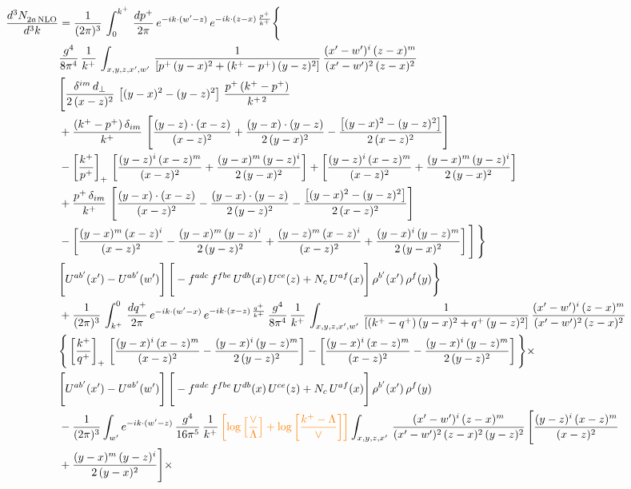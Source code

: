 \documentclass[9pt]{article}
\numberwithin{equation}{section}
\begin{document}
\begin{align}
    \frac{d^{3}N_{2a\,\rm NLO}^{\rm}}{d^{3}k}  & =  \frac{1}{(2\pi)^{3}}\,\int_{0}^{k^{+}}\, \frac{dp^{+}}{2\pi} \, e^{-ik\cdot(w'-z)}\,e^{-ik\cdot (z-x)\,\frac{p^{+}}{k^{+}}} \Bigg\{\notag \\ & \frac{g^{4}}{8\pi^{4}}\,\frac{1}{k^{+}}\,\int_{x,y,z,x',w'}\,\frac{1}{\left[p^{+}\,(y-x)^{2}+(k^{+}-p^{+})\,(y-z)^{2}\right]}\, \frac{(x'-w')^{i}\,(z-x)^{m}}{(x'-w')^{2}\,(z-x)^{2}} \notag \\ & \Bigg[\frac{\delta^{im}\,d_{\perp}}{2\,(x-z)^{2}}\,\left[(y-x)^{2}-(y-z)^{2}\right]\,\frac{p^{+}\,(k^{+}-p^{+})}{k^{+\,2}}\notag \\ & +\frac{(k^{+}-p^{+})\,\delta_{im}}{k^{+}}\,\left[\frac{(y-z)\cdot (x-z)}{(x-z)^{2}}+\frac{(y-x)\cdot (y-z)}{2\,(y-x)^{2}}-\frac{\left[(y-x)^{2}-(y-z)^{2}\right]}{2\,(x-z)^{2}}\right]\notag \\ & -\left[\frac{k^{+}}{p^{+}}\right]_{+}\,\left[\frac{(y-z)^{i}\,(x-z)^{m}}{(x-z)^{2}}+\frac{(y-x)^{m}\,(y-z)^{i}}{2\,(y-x)^{2}}\right]+ \left[\frac{(y-z)^{i}\,(x-z)^{m}}{(x-z)^{2}}+\frac{(y-x)^{m}\,(y-z)^{i}}{2\,(y-x)^{2}}\right]\notag \\ & +\frac{p^{+}\,\delta_{im}}{k^{+}}\,\left[\frac{(y-x)\cdot (x-z)}{(x-z)^{2}}-\frac{(y-x)\cdot (y-z)}{2\,(y-z)^{2}}-\frac{\left[(y-x)^{2}-(y-z)^{2}\right]}{2\,(x-z)^{2}}\right]\notag \\ &-\left[\frac{(y-x)^{m}\,(x-z)^{i}}{(x-z)^{2}}-\frac{(y-x)^{m}\,(y-z)^{i}}{2\,(y-z)^{2}}+\frac{(y-z)^{m}\,(x-z)^{i}}{(x-z)^{2}}+\frac{(y-x)^{i}\,(y-z)^{m}}{2\,(y-x)^{2}}\right]\Bigg]\,\Bigg\} \notag \\ & \Bigg[U^{ab'}(x')-U^{ab'}(w')\Bigg]\,\Bigg[-f^{adc}\,f^{fbe}\,U^{db}(x)\,U^{ce}(z)+N_{c}\,U^{af}(x)\Bigg]\,\rho^{b'}(x')\,\rho^{f}(y)\Bigg\}\notag \\ & + \frac{1}{(2\pi)^{3}}\,\int^{0}_{k^{+}}\, \frac{dq^{+}}{2\pi} \, e^{-ik\cdot(w'-x)}\,e^{-ik\cdot (x-z)\,\frac{q^{+}}{k^{+}}}\, \frac{g^{4}}{8\pi^{4}}\,\frac{1}{k^{+}}\, \int_{x,y,z,x',w'}\,\frac{1}{\left[(k^{+}-q^{+})\,(y-x)^{2}+q^{+}\,(y-z)^{2}\right]}\, \frac{(x'-w')^{i}\,(z-x)^{m}}{(x'-w')^{2}\,(z-x)^{2}} \notag \\ &\Bigg\{\left[\frac{k^{+}}{q^{+}}\right]_{+}\,\left[\frac{(y-x)^{i}\,(x-z)^{m}}{(x-z)^{2}}-\frac{(y-x)^{i}\,(y-z)^{m}}{2\,(y-z)^{2}}\right] -\left[\frac{(y-x)^{i}\,(x-z)^{m}}{(x-z)^{2}}-\frac{(y-x)^{i}\,(y-z)^{m}}{2\,(y-z)^{2}}\right]\Bigg\}\times\,\notag \\ & \Bigg[U^{ab'}(x')-U^{ab'}(w')\Bigg]\,\Bigg[-f^{adc}\,f^{fbe}\,U^{db}(x)\,U^{ce}(z)+N_{c}\,U^{af}(x)\Bigg]\,\rho^{b'}(x')\,\rho^{f}(y)\notag \\ & - \frac{1}{(2\pi)^{3}}  \int_{w^\prime} e^{-ik\cdot(w'-z)}\, \frac{g^{4}}{16\pi^{5}}\,\frac{1}{k^{+}}\,{\color{orange}\left[\log{\left[\frac{\vee}{\Lambda}\right]}+\log{\left[\frac{k^{+}-\Lambda}{\vee}\right]}\right]} \int_{x,y,z,x'}\, \frac{(x'-w')^{i}\,(z-x)^{m}}{(x'-w')^{2}\,(z-x)^{2}\, (y-z)^{2}}\,\Bigg[\frac{(y-z)^{i}\,(x-z)^{m}}{(x-z)^{2}}\notag \\ & +\frac{(y-x)^{m}\,(y-z)^{i}}{2\,(y-x)^{2}}\Bigg]\times\, 
\end{align}
\end{document}
